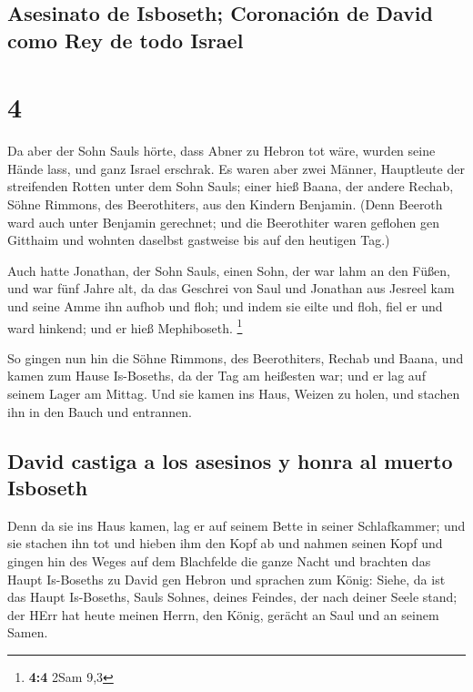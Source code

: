 \hypertarget{asesinato-de-isboseth-coronaciuxf3n-de-david-como-rey-de-todo-israel}{%
\subsection{Asesinato de Isboseth; Coronación de David como Rey de todo
Israel}\label{asesinato-de-isboseth-coronaciuxf3n-de-david-como-rey-de-todo-israel}}

\hypertarget{section-3}{%
\section{4}\label{section-3}}

 Da aber der Sohn Sauls hörte, dass Abner zu Hebron tot
wäre, wurden seine Hände lass, und ganz Israel erschrak. 
Es waren aber zwei Männer, Hauptleute der streifenden Rotten unter dem
Sohn Sauls; einer hieß Baana, der andere Rechab, Söhne Rimmons, des
Beerothiters, aus den Kindern Benjamin. (Denn Beeroth ward auch unter
Benjamin gerechnet;  und die Beerothiter waren geflohen
gen Gitthaim und wohnten daselbst gastweise bis auf den heutigen Tag.)

 Auch hatte Jonathan, der Sohn Sauls, einen Sohn, der war
lahm an den Füßen, und war fünf Jahre alt, da das Geschrei von Saul und
Jonathan aus Jesreel kam und seine Amme ihn aufhob und floh; und indem
sie eilte und floh, fiel er und ward hinkend; und er hieß Mephiboseth.
\footnote{\textbf{4:4} 2Sam 9,3}

 So gingen nun hin die Söhne Rimmons, des Beerothiters,
Rechab und Baana, und kamen zum Hause Is-Boseths, da der Tag am
heißesten war; und er lag auf seinem Lager am Mittag.  Und
sie kamen ins Haus, Weizen zu holen, und stachen ihn in den Bauch und
entrannen.

\hypertarget{david-castiga-a-los-asesinos-y-honra-al-muerto-isboseth}{%
\subsection{David castiga a los asesinos y honra al muerto
Isboseth}\label{david-castiga-a-los-asesinos-y-honra-al-muerto-isboseth}}

 Denn da sie ins Haus kamen, lag er auf seinem Bette in
seiner Schlafkammer; und sie stachen ihn tot und hieben ihm den Kopf ab
und nahmen seinen Kopf und gingen hin des Weges auf dem Blachfelde die
ganze Nacht  und brachten das Haupt Is-Boseths zu David
gen Hebron und sprachen zum König: Siehe, da ist das Haupt Is-Boseths,
Sauls Sohnes, deines Feindes, der nach deiner Seele stand; der HErr hat
heute meinen Herrn, den König, gerächt an Saul und an seinem Samen.

